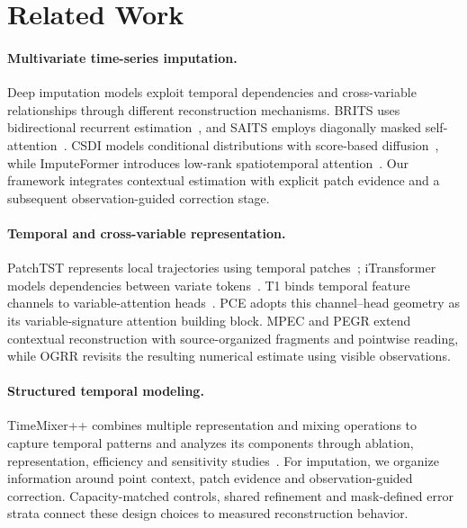 \section{Related Work}\label{sec:related}
\paragraph{Multivariate time-series imputation.}
Deep imputation models exploit temporal dependencies and cross-variable relationships through different reconstruction mechanisms. BRITS uses bidirectional recurrent estimation~\citep{brits}, and SAITS employs diagonally masked self-attention~\citep{saits}. CSDI models conditional distributions with score-based diffusion~\citep{csdi}, while ImputeFormer introduces low-rank spatiotemporal attention~\citep{imputeformer}. Our framework integrates contextual estimation with explicit patch evidence and a subsequent observation-guided correction stage.

\paragraph{Temporal and cross-variable representation.}
PatchTST represents local trajectories using temporal patches~\citep{patchtst}; iTransformer models dependencies between variate tokens~\citep{itransformer}. T1 binds temporal feature channels to variable-attention heads~\citep{t1}. PCE adopts this channel--head geometry as its variable-signature attention building block. MPEC and PEGR extend contextual reconstruction with source-organized fragments and pointwise reading, while OGRR revisits the resulting numerical estimate using visible observations.

\paragraph{Structured temporal modeling.}
TimeMixer++ combines multiple representation and mixing operations to capture temporal patterns and analyzes its components through ablation, representation, efficiency and sensitivity studies~\citep{timemixerpp}. For imputation, we organize information around point context, patch evidence and observation-guided correction. Capacity-matched controls, shared refinement and mask-defined error strata connect these design choices to measured reconstruction behavior.
